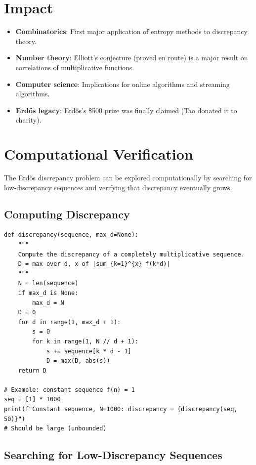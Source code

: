 \section{Impact}
\begin{itemize}
\item \textbf{Combinatorics}: First major application of entropy methods to discrepancy theory.
\item \textbf{Number theory}: Elliott's conjecture (proved en route) is a major result on correlations of multiplicative functions.
\item \textbf{Computer science}: Implications for online algorithms and streaming algorithms.
\item \textbf{Erdős legacy}: Erdős's \$500 prize was finally claimed (Tao donated it to charity).
\end{itemize}

\section{Computational Verification}

The Erd\H{o}s discrepancy problem can be explored computationally by searching for low-discrepancy sequences and verifying that discrepancy eventually grows.

\subsection{Computing Discrepancy}

\begin{verbatim}
def discrepancy(sequence, max_d=None):
    """
    Compute the discrepancy of a completely multiplicative sequence.
    D = max over d, x of |sum_{k=1}^{x} f(k*d)|
    """
    N = len(sequence)
    if max_d is None:
        max_d = N
    D = 0
    for d in range(1, max_d + 1):
        s = 0
        for k in range(1, N // d + 1):
            s += sequence[k * d - 1]
            D = max(D, abs(s))
    return D

# Example: constant sequence f(n) = 1
seq = [1] * 1000
print(f"Constant sequence, N=1000: discrepancy = {discrepancy(seq, 50)}")
# Should be large (unbounded)
\end{verbatim}

\subsection{Searching for Low-Discrepancy Sequences}


